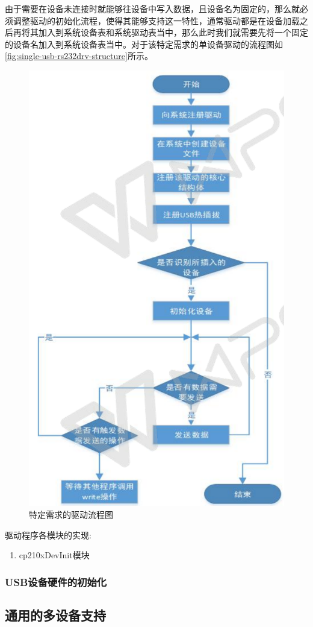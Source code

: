 	由于需要在设备未连接时就能够往设备中写入数据，且设备名为固定的，那么就必须调整驱动的初始化流程，使得其能够支持这一特性，通常驱动都是在设备加载之后再将其加入到系统设备表和系统驱动表当中，那么此时我们就需要先将一个固定的设备名加入到系统设备表当中。对于该特定需求的单设备驱动的流程图如\autoref{fig:single-usb-rs232drv-structure}所示。
\begin{figure}[!h]
\centering
\includegraphics[width=.9\textwidth]{./graphics/single-usb-rs232drv-structure.pdf}
\caption{特定需求的驱动流程图}\label{fig:single-usb-rs232drv-structure}
\end{figure}
	
	
	

驱动程序各模块的实现:
\begin{enumerate}
\item  cp210xDevInit模块

	

\end{enumerate}


\subsubsection{USB设备硬件的初始化}


\subsection{通用的多设备支持}